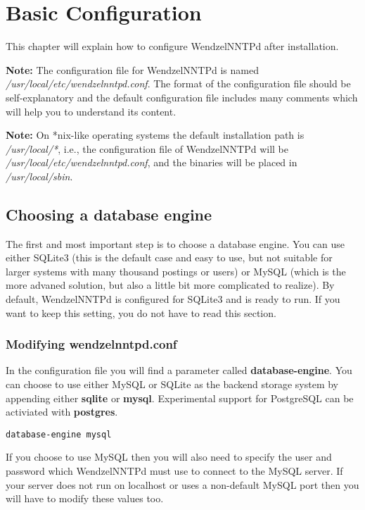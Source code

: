 \chapter{Basic Configuration}

This chapter will explain how to configure WendzelNNTPd after installation.

\textbf{Note:} The configuration file for WendzelNNTPd is named \textit{/usr/local/etc/wendzelnntpd.conf}. The format of the configuration file should be self-explanatory and the default configuration file includes many comments which will help you to understand its content.

\textbf{Note:} On *nix-like operating systems the default installation path is \textit{/usr/local/*}, i.e., the configuration file of WendzelNNTPd will be \textit{/usr/local/etc/wendzelnntpd.conf}, and the binaries will be placed in \textit{/usr/local/sbin}. %

\section{Choosing a database engine}

The first and most important step is to choose a database engine. You can use either SQLite3 (this is the default case and easy to use, but not suitable for larger systems with many thousand postings or users) or MySQL (which is the more advaned solution, but also a little bit more complicated to realize). By default, WendzelNNTPd is configured for SQLite3 and is ready to run. If you want to keep this setting, you do not have to read this section.

\subsection{Modifying wendzelnntpd.conf}

In the configuration file you will find a parameter called \textbf{database-engine}. You can choose to use either MySQL or SQLite as the backend storage system by appending either \textbf{sqlite} or \textbf{mysql}. Experimental support for PostgreSQL can be activiated with \textbf{postgres}.

\begin{verbatim}
database-engine mysql
\end{verbatim}

If you choose to use MySQL then you will also need to specify the user and password which WendzelNNTPd must use to connect to the MySQL server. If your server does not run on localhost or uses a non-default MySQL port then you will have to modify these values too.

